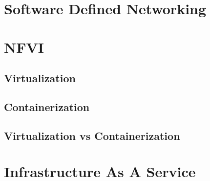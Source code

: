 \documentclass[../seminar.tex]{subfiles}
\begin{document}
	
\section{Software Defined Networking}
	
\section{NFVI}
	

	
\subsection{Virtualization}
	

	
\subsection{Containerization}
	

	
\subsection{Virtualization vs Containerization}
	

	
\section{Infrastructure As A Service}
	

	
\end{document}
